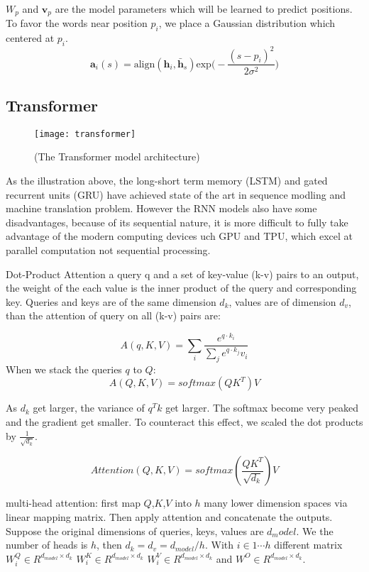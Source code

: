 ${W_p}$ and ${\bm{v}_p}$ are the model parameters which will be learned to predict positions.
To favor the words near position ${p_i}$, we place a Gaussian distribution which centered at ${p_i}$.
\[\bm{a}_i(s) = \text{align}(\bm{h}_i, \bar{\bm{h}}_s)\text{exp}\Big(-\frac{(s-p_i)^2}{2 \sigma^2}\Big) \]

\subsection{Transformer}
\begin{figure}[t]
	\texttt{[image: transformer]}
	\caption{(The Transformer model architecture\cite{vaswani2017attention})}
	\centering
\end{figure}
As the illustration above, the long-short term memory (LSTM) and gated recurrent units (GRU) have achieved state of the art in sequence modling and machine translation problem. However the RNN models also have some disadvantages, because of its sequential nature, it is more difficult to fully take advantage of the modern computing devices uch GPU and TPU, which excel at parallel computation not sequential processing.


Dot-Product Attention
a query q and a set of key-value (k-v) pairs to an output, the weight of the each value is the inner product of the query and corresponding key.
Queries and keys are of the same dimension ${d_k}$, values are of dimension ${d_v}$, than the attention of query on all (k-v) pairs are:

\[ A(q, K, V) = \sum_{i}{ \frac{e^{q\cdot k_i}}{\sum_{j} e^{q\cdot k_j} v_i}}\]
When we stack the queries ${q}$ to ${Q}$:
\[ A(Q, K, V) = softmax(QK^T)V\]

As ${d_k}$ get larger, the variance of ${q^T k}$ get larger.  The softmax become very peaked and the gradient get smaller. To counteract this effect, we scaled the dot products by ${\frac{1}{\sqrt{d_k}}}$.

\[ Attention(Q,K,V) = softmax(\frac{QK^T}{\sqrt{d_k}})V\]


multi-head attention: first map $Q$,$K$,$V$ into $h$ many lower dimension spaces via linear mapping matrix. Then apply attention and concatenate the outputs. 
Suppose the original dimensions of queries, keys, values are ${d_model}$. We the number of heads is ${h}$, then ${d_k = d_v = d_{model}/h}$. With ${i \in 1 \cdots h}$ different matrix ${W_i^Q \in R^{d_{model}\times d_k}}$ ${W_i^K \in R^{d_{model}\times d_k}}$ ${W_i^V \in R^{d_{model}\times d_k}}$ and ${W^O \in R^{d_{model}\times d_k}}$.

